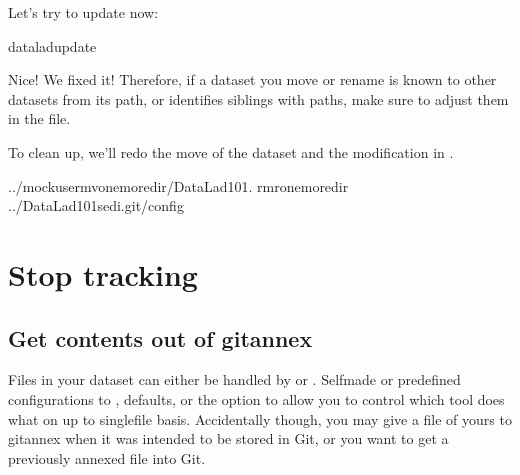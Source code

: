 \sphinxAtStartPar
Let’s try to update now:

\begin{sphinxVerbatim}[commandchars=\\\{\}]
dataladupdate
\end{sphinxVerbatim}

\sphinxAtStartPar
Nice! We fixed it!
Therefore, if a dataset you move or rename is known to other
datasets from its path, or identifies siblings with paths,
make sure to adjust them in the  file.

\sphinxAtStartPar
To clean up, we’ll redo the move of the dataset and the
modification in .

\begin{sphinxVerbatim}[commandchars=\\\{\}]
../mock\PYGZus{}usermvonemoredir/DataLad\PYGZhy{}101.
rm\PYGZhy{}ronemoredir
../DataLad\PYGZhy{}101sed\PYGZhy{}i.git/config
\end{sphinxVerbatim}


\section{Stop tracking}
\label{\detokenize{basics/101-136-filesystem:stop-tracking}}
\ignorespaces 

\subsection{Get contents out of git\sphinxhyphen{}annex}
\label{\detokenize{basics/101-136-filesystem:get-contents-out-of-git-annex}}\label{\detokenize{basics/101-136-filesystem:index-13}}
\sphinxAtStartPar
Files in your dataset can either be handled by {\hyperref[\detokenize{glossary:term-Git}]{}} or {\hyperref[\detokenize{glossary:term-git-annex}]{}}.
Self\sphinxhyphen{}made or predefined configurations to , defaults, or the
 option to  allow you to control which tool
does what on up to single\sphinxhyphen{}file basis. Accidentally though, you may give a file of yours
to git\sphinxhyphen{}annex when it was intended to be stored in Git, or you want to get a previously
annexed file into Git.

